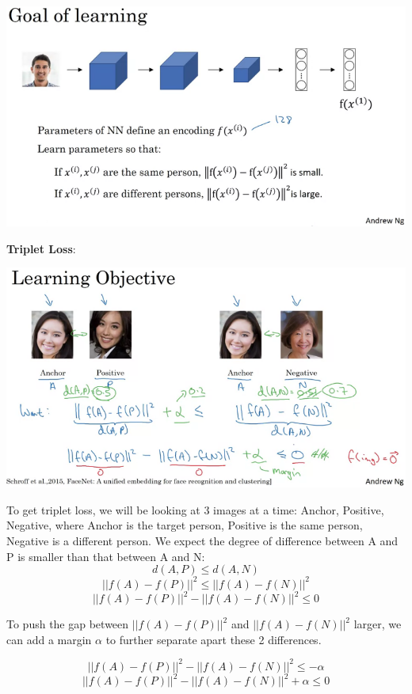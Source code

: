 \documentclass{article}
\begin{document}
\begin{center}
\includegraphics[scale=0.4]{./images/siamese_net.png}
\end{center}

\noindent \textbf{Triplet Loss}:

\begin{center}
\includegraphics[scale=0.4]{./images/triplet_loss.png}
\end{center}

\noindent To get triplet loss, we will be looking at 3 images at a time: Anchor, Positive, Negative, where Anchor is the target person, Positive is the same person, Negative is a different person. We expect the degree of difference between A and P is smaller than that between A and N:
\[d(A, P) \leq d(A, N)\]
\[||f(A) - f(P)||^{2} \leq ||f(A) - f(N)||^{2}\]
\[||f(A) - f(P)||^{2} - ||f(A) - f(N)||^{2} \leq 0\]

\noindent To push the gap between \(||f(A) - f(P)||^{2}\) and \(||f(A) - f(N)||^{2}\) larger, we can add a margin \(\alpha\) to further separate apart these 2 differences.

\[||f(A) - f(P)||^{2} - ||f(A) - f(N)||^{2} \leq -\alpha\]
\[||f(A) - f(P)||^{2} - ||f(A) - f(N)||^{2} + \alpha \leq 0\]
\end{document}

